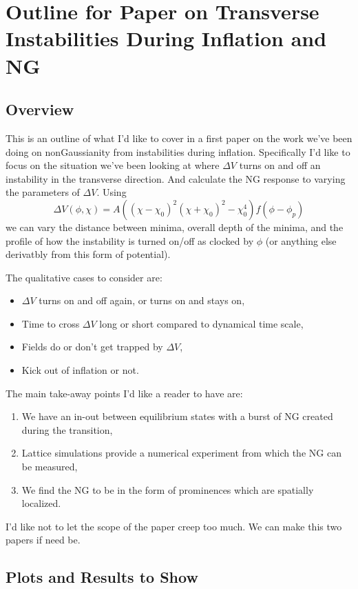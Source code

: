 \documentclass[11pt]{article}
\begin{document}
\section{Outline for Paper on Transverse Instabilities During Inflation and NG}
\subsection{Overview}
This is an outline of what I'd like to cover in a first paper on the work we've been doing on nonGaussianity from instabilities during inflation. Specifically I'd like to focus on the situation we've been looking at where $\Delta V$ turns on and off an instability in the transverse direction. And calculate the NG response to varying the parameters of $\Delta V$. Using
\begin{equation}
\Delta V(\phi,\chi) = A\left((\chi-\chi_0)^2(\chi+\chi_0)^2 - \chi_0^4 \right)f(\phi-\phi_p)
\end{equation}
we can vary the distance between minima, overall depth of the minima, and the profile of how the instability is turned on/off as clocked by $\phi$ (or anything else derivatbly from this form of potential).

The qualitative cases to consider are:
\begin{itemize}
  \item $\Delta V$ turns on and off again, or turns on and stays on,
  \item Time to cross $\Delta V$ long or short compared to dynamical time scale,
  \item Fields do or don't get trapped by $\Delta V$,
  \item Kick out of inflation or not.
\end{itemize}

The main take-away points I'd like a reader to have are:
\begin{enumerate}
  \item We have an in-out between equilibrium states with a burst of NG created during the transition,
  \item Lattice simulations provide a numerical experiment from which the NG can be measured,
  \item We find the NG to be in the form of prominences which are spatially localized.
\end{enumerate}

I'd like not to let the scope of the paper creep too much. We can make this two papers if need be.

\subsection{Plots and Results to Show}
\end{document}
